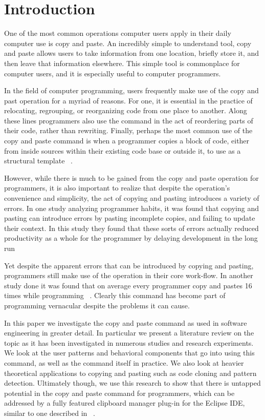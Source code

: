 \documentclass{acm_proc_article-sp}
\begin{document}

\section{Introduction}
One of the most common operations computer users apply in their daily computer use is copy and paste. An incredibly simple to understand tool, copy and paste allows users to take information from one location, briefly store it, and then leave that information elsewhere. This simple tool is commonplace for computer users, and it is especially useful to computer programmers.

In the field of computer programming, users frequently make use of the copy and past operation for a myriad of reasons. For one, it is essential in the practice of relocating, regrouping, or reorganizing code from one place to another. Along these lines programmers also use the command in the act of reordering parts of their code, rather than rewriting. Finally, perhaps the most common use of the copy and paste command is when a programmer copies a block of code, either from inside sources within their existing code base or outside it, to use as a structural template ~\cite{ooplCP}.

However, while there is much to be gained from the copy and paste operation for programmers, it is also important to realize that despite the operation's convenience and simplicity, the act of copying and pasting introduces a variety of errors. In one study analyzing programmer habits, it was found that copying and pasting can introduce errors by pasting incomplete copies, and failing to update their context. In this study they found that these sorts of errors actually reduced productivity as a whole for the programmer by delaying development in the long run ~\cite{maintenenceStudy}

Yet despite the apparent errors that can be introduced by copying and pasting, programmers still make use of the operation in their core work-flow. In another study done it was found that on average every programmer copy and pastes 16 times while programming ~\cite{ooplCP}. Clearly this command has become part of programming vernacular despite the problems it can cause.

In this paper we investigate the copy and paste command as used in software engineering in greater detail. In particular we present a literature review on the topic as it has been investigated in numerous studies and research experiments. We look at the user patterns and behavioral components that go into using this command, as well as the command itself in practice. We also look at heavier theoretical applications to copying and pasting such as code cloning and pattern detection. Ultimately though, we use this research to show that there is untapped potential in the copy and paste command for programmers, which can be addressed by a fully featured clipboard manager plug-in for the Eclipse IDE, similar to one described in ~\cite{ooplCP}.
\end{document}
